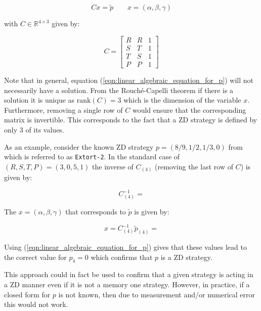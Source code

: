 \documentclass[a4paper]{article}
\begin{document}
\begin{equation}\label{eqn:linear_algebraic_equation_for_p}
    Cx=\tilde p  \qquad x=(\alpha, \beta, \gamma)
\end{equation}

with \(C\in\mathbb{R}^{4\times 3}\) given by:

\begin{equation}\label{eqn:definition_of_C}
    C =
    \begin{bmatrix}
        R & R & 1\\
        S & T & 1\\
        T & S & 1\\
        P & P & 1
    \end{bmatrix}
\end{equation}

Note that in general, equation (\ref{eqn:linear_algebraic_equation_for_p}) will
not necessarily have a solution. From the Rouch\'{e}-Capelli theorem if there is
a solution it is unique as \(\text{rank}(C)=3\) which is the dimension of the
variable \(x\). Furthermore, removing a single row of \(C\) would ensure that
the corresponding matrix is invertible. This corresponds to the fact that a ZD
strategy is defined by only 3 of its values.

As an example, consider the known ZD strategy \(p=(8 / 9, 1 / 2, 1 / 3, 0)\)
from~\cite{Stewart2012} which is referred to as \texttt{Extort-2}. In the
standard case of \((R, S, T, P)=(3, 0, 5, 1)\) the inverse
of \(C_{(4)}\) (removing the last row of \(C\)) is given by:

\begin{equation}\label{eqn:inverse_of_C4}
    C_{(4)}^{-1} =
    
\end{equation}

The \(x=(\alpha, \beta, \gamma)\) that corresponds to
\(\tilde p\) is given by:

\begin{equation}\label{eqn:alpha_beta_gamma_for_extort_2}
    x = C_{(4)}^{-1}\tilde p_{(4)} =
    
\end{equation}

Using (\ref{eqn:linear_algebraic_equation_for_p}) gives that these values lead
to the correct value for \(p_4=0\) which confirms that \(p\) is a ZD strategy.

This approach could in fact be used to confirm that a given strategy is acting
in a ZD manner even if it is not a memory one strategy. However, in practice, if
a closed form for \(p\) is not known, then due to measurement and/or numerical
error this would not work.
\end{document}
